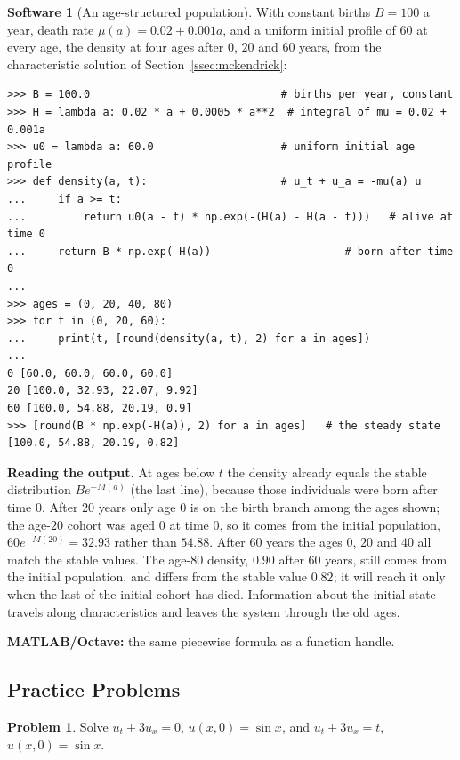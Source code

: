 \documentclass[11pt,a4paper]{article}
\numberwithin{equation}{section}
\theoremstyle{definition}
\newtheorem{software}[thm]{Software}
\newtheorem{problemx}{Problem}[subsection]
\newenvironment{problem}{\begin{problemx}}{\end{problemx}}
\begin{document}
\begin{software}[An age-structured population]
\label{sw:agestructure}
With constant births $B = 100$ a year, death rate $\mu(a) = 0.02 + 0.001a$, and a uniform initial profile of $60$ at every age, the density at four ages after $0$, $20$ and $60$ years, from the characteristic
solution of Section~\ref{ssec:mckendrick}:
{\small\begin{verbatim}
>>> B = 100.0                              # births per year, constant
>>> H = lambda a: 0.02 * a + 0.0005 * a**2  # integral of mu = 0.02 + 0.001a
>>> u0 = lambda a: 60.0                    # uniform initial age profile
>>> def density(a, t):                     # u_t + u_a = -mu(a) u
...     if a >= t:
...         return u0(a - t) * np.exp(-(H(a) - H(a - t)))   # alive at time 0
...     return B * np.exp(-H(a))                     # born after time 0
...
>>> ages = (0, 20, 40, 80)
>>> for t in (0, 20, 60):
...     print(t, [round(density(a, t), 2) for a in ages])
...
0 [60.0, 60.0, 60.0, 60.0]
20 [100.0, 32.93, 22.07, 9.92]
60 [100.0, 54.88, 20.19, 0.9]
>>> [round(B * np.exp(-H(a)), 2) for a in ages]   # the steady state
[100.0, 54.88, 20.19, 0.82]
\end{verbatim}}
\textbf{Reading the output.} At ages below $t$ the density already equals the stable distribution $Be^{-M(a)}$ (the last line), because those individuals were born after time $0$. After $20$ years only age $0$ is
on the birth branch among the ages shown; the age-$20$ cohort was aged $0$ at time $0$, so it comes from the initial population, $60e^{-M(20)} = 32.93$ rather than $54.88$. After $60$ years the ages $0$, $20$
and $40$ all match the stable values. The age-$80$ density, $0.90$ after $60$ years, still comes from the initial population, and differs from the stable value $0.82$; it will
reach it only when the last of the initial cohort has died. Information about the initial state travels along characteristics and leaves the system through the old ages.

\textbf{MATLAB/Octave:} the same piecewise formula as a function handle.
\end{software}

\subsection{Practice Problems}

\begin{problem}
Solve $u_t + 3u_x = 0$, $u(x, 0) = \sin x$, and $u_t + 3u_x = t$, $u(x, 0) = \sin x$.
\end{problem}
\end{document}
